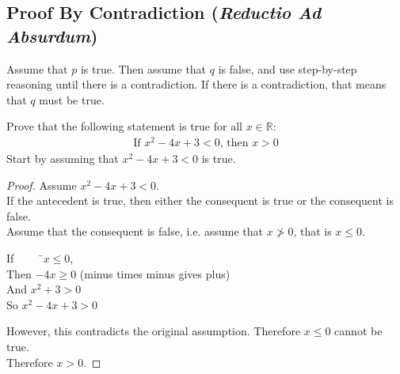 \documentclass[../notes.tex]{subfiles}
\begin{document}
			\subsection[Proof By Contradiction]{Proof By Contradiction (\emph{Reductio Ad Absurdum})}
				Assume that $p$ is true. Then assume that $q$ is false, and use step-by-step reasoning until there is a contradiction. If there is a contradiction, that means that $q$ must be true.
				\begin{example}
					Prove that the following statement is true for all $x \in \mathbb{R}$:
					\begin{align*}
						\text{If } x^{2} - 4x + 3 < 0 \text{, then } x > 0
					\end{align*}
					Start by assuming that $x^{2} - 4x + 3 < 0$ is true.
					\begin{proof}
						Assume $x^{2} - 4x + 3 < 0$.\\
						If the antecedent is true, then either the consequent is true or the consequent is false.\\
						Assume that the consequent is false, i.e. assume that $x \not > 0$, that is $x \leq 0$.
						\begin{tabbing}
							If $\qquad$ \=$x \leq 0$,\\
							Then \>$-4x \geq 0$ (minus times minus gives plus)\\
							And \>$x^{2} + 3 > 0$\\
							So \>$x^{2} - 4x + 3 > 0$
						\end{tabbing}
						However, this contradicts the original assumption. Therefore $x \leq 0$ cannot be true.\\
						Therefore $x > 0$.
					\end{proof}
				\end{example}
\end{document}

